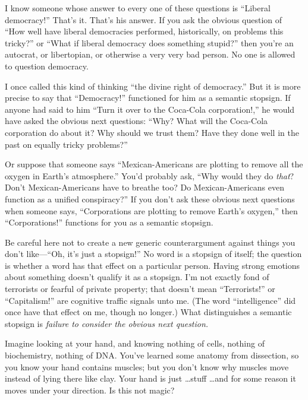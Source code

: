{
 I know someone whose answer to every one of these questions is
``Liberal democracy!''
That's it. That's his answer. If you
ask the obvious question of ``How well have liberal
democracies performed, historically, on problems this
tricky?'' or ``What if liberal
democracy does something stupid?'' then
you're an autocrat, or libertopian, or otherwise a very
very bad person. No one is allowed to question democracy.}

{
 I once called this kind of thinking ``the divine
right of democracy.'' But it is more precise to say
that ``Democracy!'' functioned for
him as a semantic stopsign. If anyone had said to him
``Turn it over to the Coca-Cola
corporation!,'' he would have asked the obvious next
questions: ``Why? What will the Coca-Cola corporation
do about it? Why should we trust them? Have they done well in the past
on equally tricky problems?''}

{
 Or suppose that someone says ``Mexican-Americans
are plotting to remove all the oxygen in Earth's
atmosphere.'' You'd probably ask,
``Why would they do \textit{that}?
Don't Mexican-Americans have to breathe too? Do
Mexican-Americans even function as a unified
conspiracy?'' If you don't ask these
obvious next questions when someone says,
``Corporations are plotting to remove
Earth's oxygen,'' then
``Corporations!'' functions for you
as a semantic stopsign.}

{
 Be careful here not to create a new generic counterargument
against things you don't like---``Oh,
it's just a stopsign!'' No word is a
stopsign of itself; the question is whether a word has that effect on a
particular person. Having strong emotions about something
doesn't qualify it as a stopsign. I'm
not exactly fond of terrorists or fearful of private property; that
doesn't mean
``Terrorists!'' or
``Capitalism!'' are cognitive
traffic signals unto me. (The word
``intelligence'' did once have that
effect on me, though no longer.) What distinguishes a semantic stopsign
is \textit{failure to consider the obvious next question.}}

\myendsectiontext


{
 Imagine looking at your hand, and knowing nothing of cells,
nothing of biochemistry, nothing of DNA. You've learned
some anatomy from dissection, so you know your hand contains muscles;
but you don't know why muscles move instead of lying
there like clay. Your hand is just \ldots stuff \ldots and for some
reason it moves under your direction. Is this not magic?}


